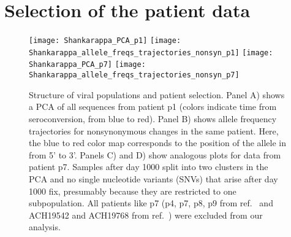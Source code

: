 

\makeatletter 
\renewcommand{\thefigure}{S\@arabic\c@figure}
\makeatother

\section{Selection of the patient data}
\begin{figure}[ht]
\begin{center}
\texttt{[image: Shankarappa\_PCA\_p1]}
\texttt{[image: Shankarappa\_allele\_freqs\_trajectories\_nonsyn\_p1]}
\texttt{[image: Shankarappa\_PCA\_p7]}
\texttt{[image: Shankarappa\_allele\_freqs\_trajectories\_nonsyn\_p7]}
\caption{Structure of viral populations and patient selection.
Panel A) shows a PCA of all sequences from patient p1 (colors indicate time from
seroconversion, from blue to red). Panel B) shows allele frequency trajectories for nonsynonymous
changes in the same patient. Here, the blue to red color map corresponds to the
position of the allele in \env{} from 5' to 3'. Panels C) and D) show analogous
plots for data from patient p7. Samples after day 1000 split into two clusters
in the PCA and no single nucleotide variants (SNVs) that arise after day 1000 fix, presumably because they are restricted
to one subpopulation. All patients like p7 (p4, p7, p8, p9 from ref.~\citealp{shankarappa_consistent_1999} and
ACH19542 and ACH19768 from ref.~\citealp{bunnik_autologous_2008}) were excluded
from our analysis.}
\label{fig:aftp}
\end{center}
\end{figure}

\newpage
